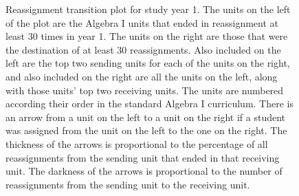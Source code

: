 \documentclass[12pt]{article}\usepackage[]{graphicx}\usepackage[]{color}
\begin{document}
\begin{figure}
\begin{subfigure}{1in}
\end{subfigure}
\caption{Reassignment transition plot for study year 1. The units on
  the left of the plot are the Algebra I units that ended in reassignment at
  least 30 times in year 1. The units on the right are those that were
  the destination of at least 30 reassignments. Also included on the
  left are the top two sending units for each of the units on the
  right, and also included on the right are all the units on the left,
  along with those units' top two receiving units. The units are numbered
  according their order in the standard Algebra I curriculum. There is an arrow from a
  unit on the left to a unit on the right if a student was assigned
  from the unit on the left to the one on the right. The thickness of
  the arrows is proportional to the percentage of all reassignments from
  the sending unit that ended in that receiving unit. The darkness of
  the arrows is proportional to the number of reassignments from the
  sending unit to the receiving unit.}
\label{fig:trans1}
\end{figure}
\end{document}
